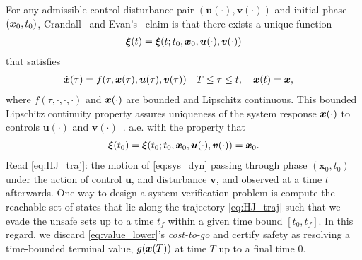 For any admissible control-disturbance pair $(\bm{u}(\cdot), \bm{v}(\cdot))$ and initial phase $(\bm{x}_0, t_0)$, Crandall~\cite{Crandall1983viscosity} and Evan's~\cite{Evans1984} claim is that there exists a unique function %
%
\begin{align}
	\bm{\xi}(t) = \bm{\xi}(t; t_0, \bm{x}_0, \bm{u}(\cdot), \bm{v}(\cdot))
	\label{eq:HJ_traj}
\end{align}
%
that satisfies 
%
\begin{subequations}
	\begin{align}
		\dot{\bm{x}}(\tau) &= f(\tau, \bm{x}(\tau), \bm{u}(\tau), \bm{v}(\tau)) \quad T \le \tau \le t, \quad \bm{x}(t) = \bm{x},
	\end{align}
	\label{eq:sys_dyn}
\end{subequations}
%
\noindent where $f(\tau, \cdot, \cdot, \cdot)$ and $\bm{x}(\cdot)$ are bounded and Lipschitz continuous. This bounded Lipschitz continuity property assures uniqueness of the system response $\bm{x}(\cdot)$ to controls $\bm{u}(\cdot)$ and $\bm{v}(\cdot)$~\cite{Souganidis}. 
%
a.e. with the property that
%
\begin{align}
	\bm{\xi}(t_0) = \bm{\xi}(t_0; t_0, \bm{x}_0, \bm{u}(\cdot), \bm{v}(\cdot)) = \bm{x}_0.
\end{align}
%
Read \eqref{eq:HJ_traj}: the motion of \eqref{eq:sys_dyn} passing through phase $(\bm{x}_0, t_0)$ under the action of control $\bm{u}$, and disturbance $\bm{v}$, and observed at a time $t$ afterwards. One way to design a system verification problem is compute the reachable set of states that lie along the trajectory \eqref{eq:HJ_traj} such that we evade the unsafe sets up to a time \eg $t_f$ within a given time bound  $\left[t_0, t_f\right]$. In this regard, we discard \eqref{eq:value_lower}'s \textit{cost-to-go} and certify safety as resolving a time-bounded terminal value, $g(\bm{x}(T))$ at time $T$ up to a final time \eg $0$.


